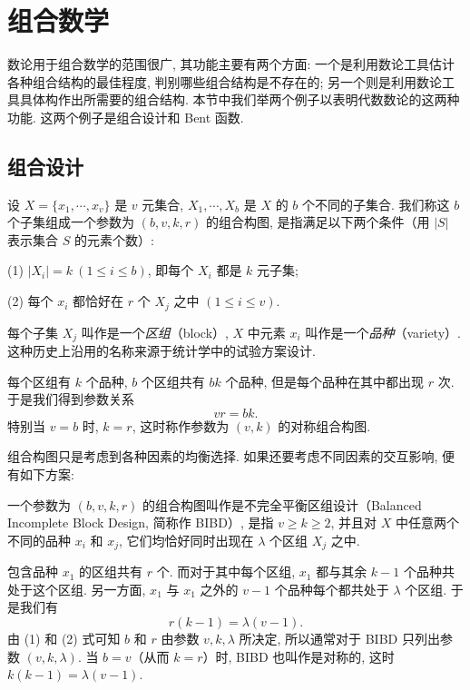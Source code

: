 \section{组合数学}\label{sec:ch9-s5}

数论用于组合数学的范围很广, 其功能主要有两个方面: 一个是利用数论工具估计各种组合结构的最佳程度, 判别哪些组合结构是不存在的; 另一个则是利用数论工具具体构作出所需要的组合结构. 本节中我们举两个例子以表明代数数论的这两种功能. 这两个例子是组合设计和 Bent 函数.

\subsection{组合设计}

\begin{definition}\label{def:ch9-5}
设 $X=\{x_1,\cdots,x_v\}$ 是 $v$ 元集合, $X_1,\cdots,X_b$ 是 $X$ 的 $b$ 个不同的子集合. 我们称这 $b$ 个子集组成一个参数为 $(b,v,k,r)$ 的组合构图, 是指满足以下两个条件（用 $|S|$ 表示集合 $S$ 的元素个数）:

(1) $|X_i|=k\ (1\leqslant i\leqslant b)$, 即每个 $X_i$ 都是 $k$ 元子集;

(2) 每个 $x_i$ 都恰好在 $r$ 个 $X_j$ 之中 $(1\leqslant i\leqslant v)$.

每个子集 $X_j$ 叫作是一个\emph{区组}（block）, $X$ 中元素 $x_i$ 叫作是一个\emph{品种}（variety）. 这种历史上沿用的名称来源于统计学中的试验方案设计.
\end{definition}

每个区组有 $k$ 个品种, $b$ 个区组共有 $bk$ 个品种, 但是每个品种在其中都出现 $r$ 次. 于是我们得到参数关系
\begin{equation}\tag{1}
  vr=bk.
\end{equation}
特别当 $v=b$ 时, $k=r$, 这时称作参数为 $(v,k)$ 的对称组合构图.

组合构图只是考虑到各种因素的均衡选择. 如果还要考虑不同因素的交互影响, 便有如下方案:

\begin{definition}\label{def:ch9-6}
一个参数为 $(b,v,k,r)$ 的组合构图叫作是不完全平衡区组设计（Balanced Incomplete Block Design, 简称作 BIBD）, 是指 $v\geqslant k\geqslant 2$, 并且对 $X$ 中任意两个不同的品种 $x_i$ 和 $x_j$, 它们均恰好同时出现在 $\lambda$ 个区组 $X_j$ 之中.
\end{definition}

包含品种 $x_1$ 的区组共有 $r$ 个. 而对于其中每个区组, $x_1$ 都与其余 $k-1$ 个品种共处于这个区组. 另一方面, $x_1$ 与 $x_1$ 之外的 $v-1$ 个品种每个都共处于 $\lambda$ 个区组. 于是我们有
\begin{equation}\tag{2}
  r(k-1)=\lambda(v-1).
\end{equation}
由 (1) 和 (2) 式可知 $b$ 和 $r$ 由参数 $v,k,\lambda$ 所决定, 所以通常对于 BIBD 只列出参数 $(v,k,\lambda)$. 当 $b=v$（从而 $k=r$）时, BIBD 也叫作是对称的, 这时 $k(k-1)=\lambda(v-1)$.

